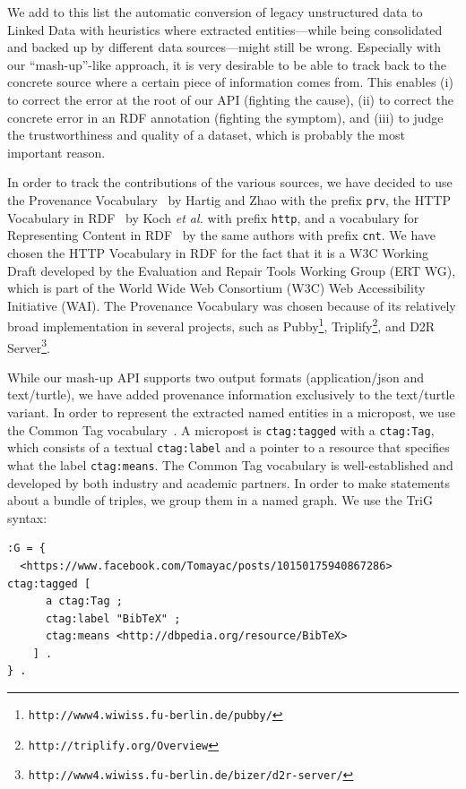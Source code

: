 \documentclass[twocolumn]{article}
\begin{document}
We add to this list the automatic conversion of legacy unstructured data to Linked Data with heuristics where extracted entities---while being consolidated and backed up by different data sources---might still be wrong. Especially with our ``mash-up''-like approach, it is very desirable to be able to track back to the concrete source where a certain piece of information comes from. This enables (i) to correct the error at the root of our API (fighting the cause), (ii) to correct the concrete error in an RDF annotation (fighting the symptom), and (iii) to judge the trustworthiness and quality of a dataset, which is probably the most important reason.

In order to track the contributions of the various sources, we have decided to use the Provenance Vocabulary~\cite{Hartig:Provenance} by Hartig and Zhao with the prefix \texttt{prv}, the HTTP Vocabulary in RDF~\cite{HTTP:RDF} by Koch \emph{et al.} with prefix \texttt{http}, and a vocabulary for Representing Content in RDF~\cite{CNT:RDF} by the same authors with prefix \texttt{cnt}. We have chosen the HTTP Vocabulary in RDF for the fact that it is a W3C Working Draft  developed by the Evaluation and Repair Tools Working Group (ERT WG), which is part of the World Wide Web Consortium (W3C) Web Accessibility Initiative (WAI). The Provenance Vocabulary was chosen because of its relatively broad implementation in several projects, such as Pubby\footnote{\texttt{http://www4.wiwiss.fu-berlin.de/pubby/}}, Triplify\footnote{\texttt{http://triplify.org/Overview}}, and D2R Server\footnote{\texttt{http://www4.wiwiss.fu-berlin.de/bizer/d2r-server/}}.

While our mash-up API supports two output formats (application/json and text/turtle), we have added provenance information exclusively to the text/turtle variant. In order to represent the extracted named entities in a micropost, we use the Common Tag vocabulary~\cite{CommonTag:Spec}. A micropost is \texttt{ctag:tagged} with a \texttt{ctag:Tag}, which consists of a textual \texttt{ctag:label} and a pointer to a resource that specifies what the label \texttt{ctag:means}. The Common Tag vocabulary is well-established and developed by both industry and academic partners. In order to make statements about a bundle of triples, we group them in a named graph. We use the TriG~\cite{Bizer:TriG} syntax:
\vspace{2em}
\begin{lstlisting}
:G = {
  <https://www.facebook.com/Tomayac/posts/10150175940867286> ctag:tagged [
      a ctag:Tag ;
      ctag:label "BibTeX" ;
      ctag:means <http://dbpedia.org/resource/BibTeX>
    ] .
} .
\end{lstlisting}
\end{document}
